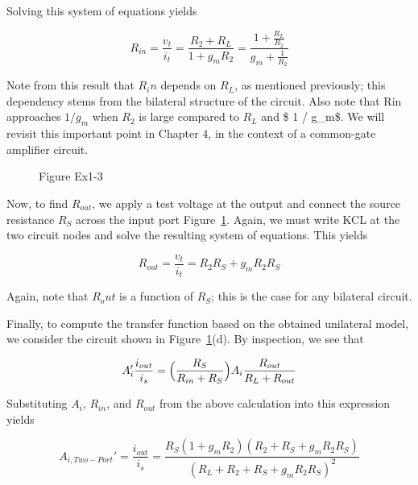 \documentclass[
  11pt,
  letterpaper,
  abstract]{scrbook}
\begin{document}
Solving this system of equations yields

\[
R_{in} = \frac{v_t}{i_t} = \frac{R_2 + R_L}{1 + g_m R_2} = \frac{1 + \frac{R_L}{R_2}}{g_m + \frac{1}{R_2}}
\]

Note from this result that \(R_in\) depends on \(R_L\), as mentioned
previously; this dependency stems from the bilateral structure of the
circuit. Also note that Rin approaches \(1 / g_m\) when \(R_2\) is large
compared to \(R_L\) and \$ 1 / g\_m\$. We will revisit this important
point in Chapter 4, in the context of a common-gate amplifier circuit.

\begin{figure}


\caption{\label{fig-ex-1.3}Figure Ex1-3}

\end{figure}%

Now, to find \(R_{out}\), we apply a test voltage at the output and
connect the source resistance \(R_S\) across the input port
Figure~\ref{fig-ex-1.3}. Again, we must write KCL at the two circuit
nodes and solve the resulting system of equations. This yields

\[
R_{out} = \frac{v_t}{i_t} = R_2 R_S + g_m R_2 R_S
\]

Again, note that \(R_out\) is a function of \(R_S\); this is the case
for any bilateral circuit.

Finally, to compute the transfer function based on the obtained
unilateral model, we consider the circuit shown in
Figure~\ref{fig-ex-1.3}(d). By inspection, we see that

\[
A_i' \frac{i_{out}}{i_s} = \Bigl( \frac{R_S}{R_{in} + R_S} \Bigr) A_i \frac{R_{out}}{R_L + R_{out}}
\]

Substituting \(A_i\), \(R_{in}\), and \(R_{out}\) from the above
calculation into this expression yields

\[
A_{i, Two-Port}' = \frac{i_{out}}{i_s} = \frac{R_S(1 + g_m R_2)(R_2 + R_S + g_m R_2 R_S)}{(R_L + R_2 + R_S + g_m R_2 R_S)^2}
\]
\end{document}
